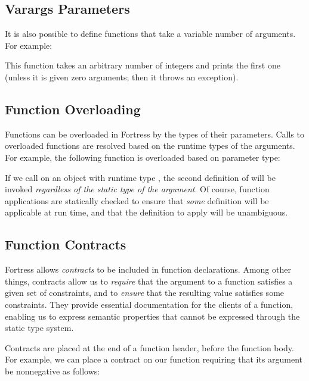 \subsection{Varargs Parameters}
It is also possible to define functions that take a variable number of
arguments.
For example:


This function takes an arbitrary number of integers and prints the first
one (unless it is given zero arguments; then it throws an exception).

\subsection{Function Overloading}
Functions can be overloaded in Fortress
by the types of their parameters. Calls to overloaded functions are
resolved based on the runtime types of the arguments. For example,
the following function is overloaded based on parameter type:




If we call  on an object with runtime type , the
second definition of  will be invoked \emph{regardless of the static type of the argument}.
Of course, function applications are
statically checked to ensure that \emph{some} definition will be
applicable at run time, and that the definition to apply will
be unambiguous.


\subsection{Function Contracts}

Fortress allows \emph{contracts} to be included in function declarations.
Among other things,
contracts allow us to \emph{require}
that the argument to a function satisfies a given set of constraints,
and to \emph{ensure} that the resulting value satisfies some constraints.
They provide essential documentation for the clients of a function,
enabling us to express semantic properties
that cannot be expressed through the static type system.

Contracts are placed at the end of a function header, before the function body.
For example, we can place a contract on our  function requiring
that its argument be nonnegative as follows:


